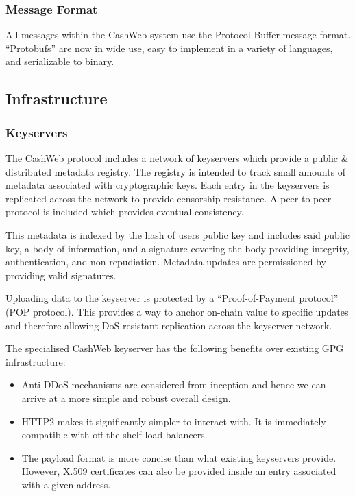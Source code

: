 \documentclass{article}
\begin{document}
\subsubsection{Message Format}

All messages within the CashWeb system use the Protocol Buffer\cite{protobufs} message format. ``Protobufs'' are now in wide use, easy to implement in a variety of languages, and serializable to binary.

\subsection{Infrastructure}

\subsubsection{Keyservers}

The CashWeb protocol includes a network of keyservers which provide a public \& distributed metadata registry. The registry is intended to track small amounts of metadata associated with cryptographic keys. Each entry in the keyservers is replicated across the network to provide censorship resistance. A peer-to-peer protocol is included which provides eventual consistency.

This metadata is indexed by the hash of users public key and includes said public key, a body of information, and a signature covering the body providing integrity, authentication, and non-repudiation. Metadata updates are permissioned by providing valid signatures.

Uploading data to the keyserver is protected by a ``Proof-of-Payment protocol'' (POP protocol). This provides a way to anchor on-chain value to specific updates and therefore allowing DoS resistant replication across the keyserver network.

The specialised CashWeb keyserver has the following benefits over existing GPG infrastructure:
\begin{itemize}
  \item Anti-DDoS mechanisms are considered from inception and hence we can arrive at a more simple and robust overall design.
  \item HTTP2 makes it significantly simpler to interact with. It is immediately compatible with off-the-shelf load balancers.
  \item The payload format is more concise than what existing keyservers provide. However, X.509 certificates can also be provided inside an entry associated with a given address.
\end{itemize}
\end{document}
